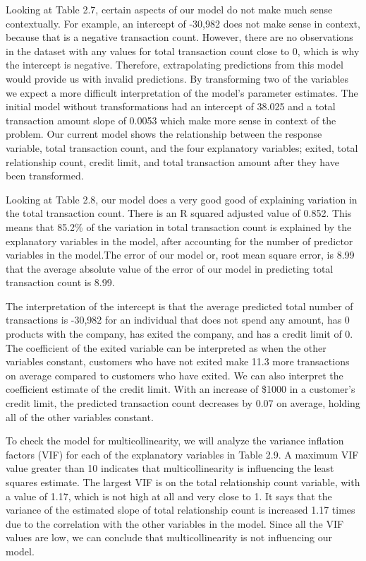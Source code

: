 \documentclass[
]{article}
\begin{document}
Looking at Table 2.7, certain aspects of our model do not make much
sense contextually. For example, an intercept of -30,982 does not make
sense in context, because that is a negative transaction count. However,
there are no observations in the dataset with any values for total
transaction count close to 0, which is why the intercept is negative.
Therefore, extrapolating predictions from this model would provide us
with invalid predictions. By transforming two of the variables we expect
a more difficult interpretation of the model's parameter estimates. The
initial model without transformations had an intercept of 38.025 and a
total transaction amount slope of 0.0053 which make more sense in
context of the problem. Our current model shows the relationship between
the response variable, total transaction count, and the four explanatory
variables; exited, total relationship count, credit limit, and total
transaction amount after they have been transformed.

Looking at Table 2.8, our model does a very good good of explaining
variation in the total transaction count. There is an R squared adjusted
value of 0.852. This means that 85.2\% of the variation in total
transaction count is explained by the explanatory variables in the
model, after accounting for the number of predictor variables in the
model.The error of our model or, root mean square error, is 8.99 that
the average absolute value of the error of our model in predicting total
transaction count is 8.99.

The interpretation of the intercept is that the average predicted total
number of transactions is -30,982 for an individual that does not spend
any amount, has 0 products with the company, has exited the company, and
has a credit limit of 0. The coefficient of the exited variable can be
interpreted as when the other variables constant, customers who have not
exited make 11.3 more transactions on average compared to customers who
have exited. We can also interpret the coefficient estimate of the
credit limit. With an increase of \$1000 in a customer's credit limit,
the predicted transaction count decreases by 0.07 on average, holding
all of the other variables constant.

To check the model for multicollinearity, we will analyze the variance
inflation factors (VIF) for each of the explanatory variables in Table
2.9. A maximum VIF value greater than 10 indicates that
multicollinearity is influencing the least squares estimate. The largest
VIF is on the total relationship count variable, with a value of 1.17,
which is not high at all and very close to 1. It says that the variance
of the estimated slope of total relationship count is increased 1.17
times due to the correlation with the other variables in the model.
Since all the VIF values are low, we can conclude that multicollinearity
is not influencing our model.
\end{document}
